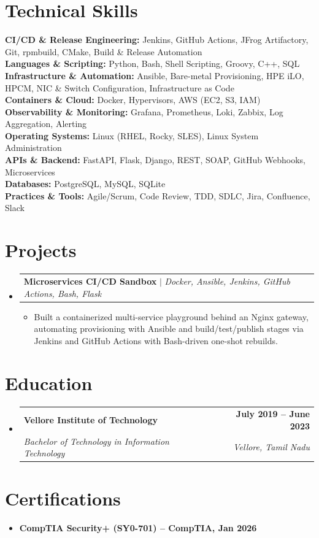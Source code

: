 \documentclass[letterpaper,11pt]{article}
\makeatletter
\newcommand{\resumeItem}[1]{
  \item\small{
    {#1 \vspace{-2pt}}
  }
}
\newcommand{\resumeSubheading}[4]{
  \vspace{-2pt}\item
    \begin{tabular*}{1.0\textwidth}[t]{l@{\extracolsep{\fill}}r}
      \textbf{#1} & \textbf{\small #2} \\
      \textit{\small#3} & \textit{\small #4} \\
    \end{tabular*}\vspace{-7pt}
}
\newcommand{\resumeProjectHeading}[2]{
    \item
    \begin{tabular*}{1.001\textwidth}{l@{\extracolsep{\fill}}r}
      \small#1 & \textbf{\small #2}\\
    \end{tabular*}\vspace{-7pt}
}
\newcommand{\resumeSubHeadingListStart}{\begin{itemize}[leftmargin=0.0in, label={}]}
\newcommand{\resumeSubHeadingListEnd}{\end{itemize}}
\newcommand{\resumeItemListStart}{\begin{itemize}}
\newcommand{\resumeItemListEnd}{\end{itemize}\vspace{-5pt}}
\makeatother
\begin{document}
\section{Technical Skills}
 \begin{itemize}[leftmargin=0.15in, label={}]
    \small{\item{
     \textbf{CI/CD \& Release Engineering:} {Jenkins, GitHub Actions, JFrog Artifactory, Git, rpmbuild, CMake, Build \& Release Automation} \\
     \textbf{Languages \& Scripting:} {Python, Bash, Shell Scripting, Groovy, C++, SQL} \\
     \textbf{Infrastructure \& Automation:} {Ansible, Bare-metal Provisioning, HPE iLO, HPCM, NIC \& Switch Configuration, Infrastructure as Code} \\
     \textbf{Containers \& Cloud:} {Docker, Hypervisors, AWS (EC2, S3, IAM)} \\
     \textbf{Observability \& Monitoring:} {Grafana, Prometheus, Loki, Zabbix, Log Aggregation, Alerting} \\
     \textbf{Operating Systems:} {Linux (RHEL, Rocky, SLES), Linux System Administration} \\
     \textbf{APIs \& Backend:} {FastAPI, Flask, Django, REST, SOAP, GitHub Webhooks, Microservices} \\
     \textbf{Databases:} {PostgreSQL, MySQL, SQLite} \\
     \textbf{Practices \& Tools:} {Agile/Scrum, Code Review, TDD, SDLC, Jira, Confluence, Slack} \\
    }}
 \end{itemize}
 \vspace{-16pt}
\section{Projects}
\resumeSubHeadingListStart
  \resumeProjectHeading{\textbf{Microservices CI/CD Sandbox} $|$ \emph{Docker, Ansible, Jenkins, GitHub Actions, Bash, Flask}}{}
    \resumeItemListStart
      \resumeItem{Built a containerized multi-service playground behind an Nginx gateway, automating provisioning with Ansible and build/test/publish stages via Jenkins and GitHub Actions with Bash-driven one-shot rebuilds.}
    \resumeItemListEnd
\resumeSubHeadingListEnd
\vspace{-14pt}
\section{Education}
  \resumeSubHeadingListStart
    \resumeSubheading
      {Vellore Institute of Technology}{July 2019 -- June 2023}
      {Bachelor of Technology in Information Technology}{Vellore, Tamil Nadu}
  \resumeSubHeadingListEnd

\section{Certifications}
\resumeSubHeadingListStart
\begin{itemize}
\item \textbf{CompTIA Security+ (SY0-701) -- CompTIA, Jan 2026}
\end{itemize}
\resumeSubHeadingListEnd
\end{document}
